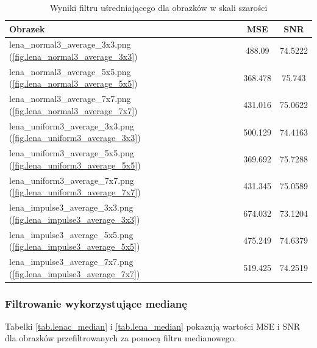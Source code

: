 \documentclass{classrep}
\begin{document}
\begin{table}
  \centering
  \begin{tabular}{|l|c|c|}
    \hline
    \textbf{Obrazek} & \textbf{MSE} & \textbf{SNR} \\
    \hline\hline
    lena\_normal3\_average\_3x3.png (\ref{fig.lena_normal3_average_3x3}) & 488.09 & 74.5222 \\ 
    \hline 
    lena\_normal3\_average\_5x5.png (\ref{fig.lena_normal3_average_5x5}) & 368.478 & 75.743 \\ 
    \hline 
    lena\_normal3\_average\_7x7.png (\ref{fig.lena_normal3_average_7x7}) & 431.016 & 75.0622 \\ 
    \hline 
    lena\_uniform3\_average\_3x3.png (\ref{fig.lena_uniform3_average_3x3}) & 500.129 & 74.4163 \\ 
    \hline 
    lena\_uniform3\_average\_5x5.png (\ref{fig.lena_uniform3_average_5x5}) & 369.692 & 75.7288 \\ 
    \hline 
    lena\_uniform3\_average\_7x7.png (\ref{fig.lena_uniform3_average_7x7}) & 431.345 & 75.0589 \\ 
    \hline 
    lena\_impulse3\_average\_3x3.png (\ref{fig.lena_impulse3_average_3x3}) & 674.032 & 73.1204 \\ 
    \hline 
    lena\_impulse3\_average\_5x5.png (\ref{fig.lena_impulse3_average_5x5}) & 475.249 & 74.6379 \\ 
    \hline 
    lena\_impulse3\_average\_7x7.png (\ref{fig.lena_impulse3_average_7x7}) & 519.425 & 74.2519 \\ 
    \hline 
  \end{tabular}
  \caption{Wyniki filtru uśredniającego dla obrazków w skali szarości}
  \label{tab.lena_average}
\end{table}

\subsubsection{Filtrowanie wykorzystujące medianę}
Tabelki \ref{tab.lenac_median} i \ref{tab.lena_median} pokazują wartości MSE i SNR dla obrazków przefiltrowanych za pomocą filtru medianowego.
\end{document}
